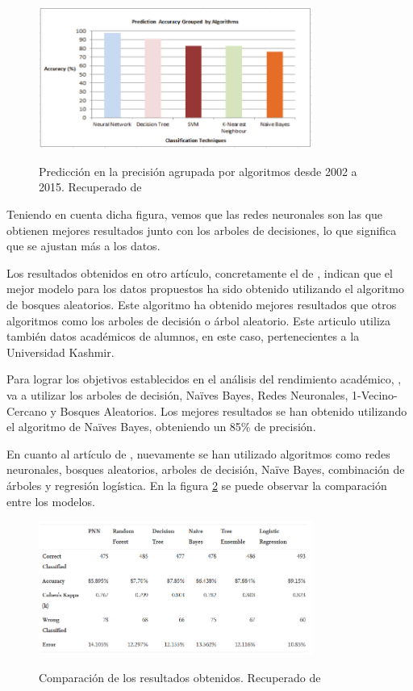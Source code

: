 \begin{figure}[htb]
	\centering
	\caption{Predicción en la precisión agrupada por algoritmos desde 2002 a 2015. Recuperado de \protect{}}
	\includegraphics[width=0.8\textwidth]{recursos/PrecisionMetodos}
	\label{fig:precMet}
\end{figure}

Teniendo en cuenta dicha figura, vemos que las redes neuronales son las que obtienen mejores resultados junto con los arboles de decisiones, lo que significa que se ajustan más a los datos. 

Los resultados obtenidos en otro artículo, concretamente el de , indican que el mejor modelo para los datos propuestos ha sido obtenido utilizando el algoritmo de bosques aleatorios. Este algoritmo ha obtenido mejores resultados que otros algoritmos como los arboles de decisión o árbol aleatorio. Este articulo utiliza también datos académicos de alumnos, en este caso, pertenecientes a la Universidad Kashmir.

Para lograr los objetivos establecidos en el análisis del rendimiento académico, , va a utilizar los arboles de decisión, Naïves Bayes, Redes Neuronales, 1-Vecino-Cercano y Bosques Aleatorios. Los mejores resultados se han obtenido utilizando el algoritmo de Naïves Bayes, obteniendo un 85\% de precisión.

En cuanto al artículo de , nuevamente se han utilizado algoritmos como redes neuronales, bosques aleatorios, arboles de decisión, Naïve Bayes, combinación de árboles y regresión logística. En la figura \ref{fig:compResMod} se puede observar la comparación entre los modelos.

\begin{figure}[htb]
	\centering
	\caption{Comparación de los resultados obtenidos. Recuperado de \protect{}}
	\includegraphics[width=0.8\textwidth]{recursos/ComparacionModelos}
	\label{fig:compResMod}
\end{figure}
\FloatBarrier

